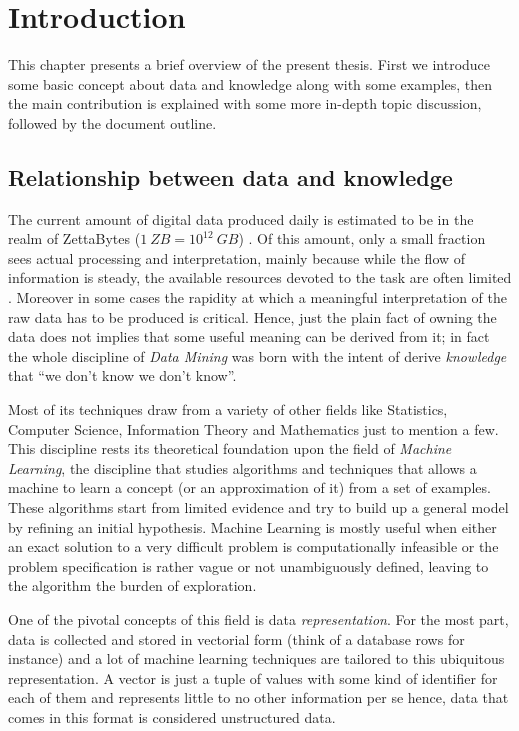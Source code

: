 
\chapter{Introduction} %
\label{Chapter1} %

This chapter presents a brief overview of the present thesis.
First we introduce some basic concept about data and knowledge along with some examples,
then the main contribution is explained with some more in-depth topic discussion,
followed by the document outline.

\section{Relationship between data and knowledge}

The current amount of digital data produced daily is estimated to be in the realm of 
ZettaBytes ($1~ZB = 10^{12}~GB$) \cite{idc}.
Of this amount, only a small fraction sees actual processing and interpretation,
mainly because while the flow of information is steady, the available resources
devoted to the task are often limited \cite{idc}.
Moreover in some cases the rapidity at which a meaningful interpretation of the 
raw data has to be produced is critical.
Hence, just the plain fact of owning the data does not implies that some useful 
meaning can be derived from it; in fact the whole discipline of \emph{Data Mining}
was born with the intent of derive \emph{knowledge} that ``we don't know we don't know''.

Most of its techniques draw from a variety of other fields like Statistics,
Computer Science, Information Theory and Mathematics just to mention a few.
This discipline rests its theoretical foundation upon the field of \emph{Machine Learning},
the discipline that studies algorithms and techniques that allows a machine
to learn a concept (or an approximation of it) from a set of examples.
These algorithms start from limited evidence and try to build up a general model
by refining an initial hypothesis.
Machine Learning is mostly useful when either an exact solution to a very
difficult problem is computationally infeasible or the problem specification
is rather vague or not unambiguously defined, leaving to the algorithm the burden
of exploration.

One of the pivotal concepts of this field is data \emph{representation}.
For the most part, data is collected and stored in vectorial form (think of
a database rows for instance) and a lot of machine learning techniques are
tailored to this ubiquitous representation.
A vector is just a tuple of values with some kind of identifier for each of them
and represents little to no other information per se hence, data that comes in
this format is considered unstructured data.

